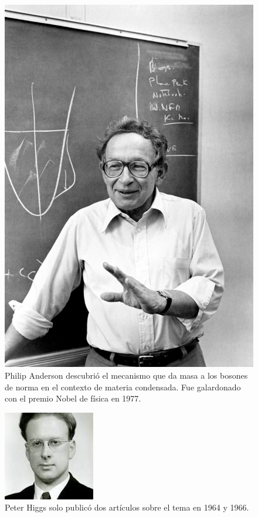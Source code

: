 \documentclass[12pt,a4paper]{report}
\begin{document}
	\begin{figure}
	\includegraphics[scale=0.3]{images/anderson.jpg}
	\caption{Philip Anderson descubri\'o el mecanismo que da masa a los bosones de norma en el contexto de materia condensada. Fue galardonado con el premio Nobel de f\'isica en 1977.}
	\end{figure}
	
	\begin{figure}
	\includegraphics[scale=1]{images/higgs_joven.jpeg}
	\caption{Peter Higgs solo public\'o dos art\'iculos sobre el tema en 1964 y 1966.}
	\end{figure}
	
\end{document}
